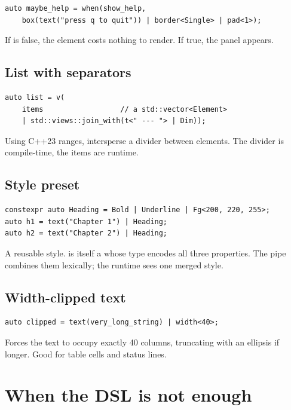 \begin{lstlisting}
auto maybe_help = when(show_help,
    box(text("press q to quit")) | border<Single> | pad<1>);
\end{lstlisting}

If  is false, the element costs nothing to
render. If true, the panel appears.

\subsection*{List with separators}

\begin{lstlisting}
auto list = v(
    items                  // a std::vector<Element>
    | std::views::join_with(t<" --- "> | Dim));
\end{lstlisting}

Using C++23 ranges, intersperse a divider between elements. The
divider is compile-time, the items are runtime.

\subsection*{Style preset}

\begin{lstlisting}
constexpr auto Heading = Bold | Underline | Fg<200, 220, 255>;
auto h1 = text("Chapter 1") | Heading;
auto h2 = text("Chapter 2") | Heading;
\end{lstlisting}

A reusable style.  is itself a  whose
type encodes all three properties. The pipe combines them
lexically; the runtime sees one merged style.

\subsection*{Width-clipped text}

\begin{lstlisting}
auto clipped = text(very_long_string) | width<40>;
\end{lstlisting}

Forces the text to occupy exactly 40 columns, truncating with an
ellipsis if longer. Good for table cells and status lines.

\section{When the DSL is not enough}

